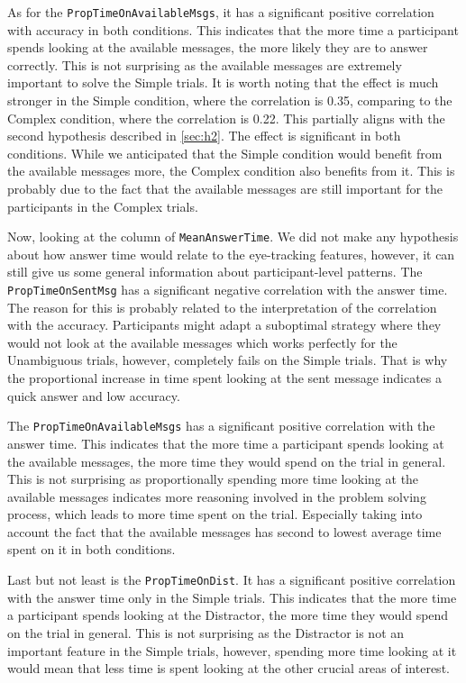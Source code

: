 As for the \texttt{PropTimeOnAvailableMsgs}, it has a significant positive correlation with accuracy in both conditions. This indicates that the more time a participant spends looking at the available messages, the more likely they are to answer correctly. This is not surprising as the available messages are extremely important to solve the Simple trials. It is worth noting that the effect is much stronger in the Simple condition, where the correlation is 0.35, comparing to the Complex condition, where the correlation is 0.22. This partially aligns with the second hypothesis described in \autoref{sec:h2}. The effect is significant in both conditions. While we anticipated that the Simple condition would benefit from the available messages more, the Complex condition also benefits from it. This is probably due to the fact that the available messages are still important for the participants in the Complex trials.

\sloppy
Now, looking at the column of \texttt{MeanAnswerTime}. We did not make any hypothesis about how answer time would relate to the eye-tracking features, however, it can still give us some general information about participant-level patterns. The \texttt{PropTimeOnSentMsg} has a significant negative correlation with the answer time. The reason for this is probably related to the interpretation of the correlation with the accuracy. Participants might adapt a suboptimal strategy where they would not look at the available messages which works perfectly for the Unambiguous trials, however, completely fails on the Simple trials. That is why the proportional increase in time spent looking at the sent message indicates a quick answer and low accuracy. 
\sloppy

The \texttt{PropTimeOnAvailableMsgs} has a significant positive correlation with the answer time. This indicates that the more time a participant spends looking at the available messages, the more time they would spend on the trial in general. This is not surprising as proportionally spending more time looking at the available messages indicates more reasoning involved in the problem solving process, which leads to more time spent on the trial. Especially taking into account the fact that the available messages has second to lowest average time spent on it in both conditions. 

Last but not least is the \texttt{PropTimeOnDist}. It has a significant positive correlation with the answer time only in the Simple trials. This indicates that the more time a participant spends looking at the Distractor, the more time they would spend on the trial in general. This is not surprising as the Distractor is not an important feature in the Simple trials, however, spending more time looking at it would mean that less time is spent looking at the other crucial areas of interest.

